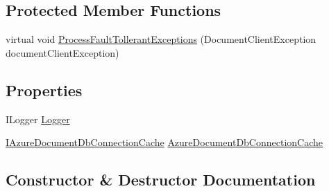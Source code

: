 \subsection*{Protected Member Functions}
\begin{DoxyCompactItemize}
\item 
virtual void \hyperlink{classCqrs_1_1Azure_1_1DocumentDb_1_1AzureDocumentDbHelper_a90b2dc3510f45a7cd5e6ed467a6f6d5e_a90b2dc3510f45a7cd5e6ed467a6f6d5e}{Process\+Fault\+Tollerant\+Exceptions} (Document\+Client\+Exception document\+Client\+Exception)
\end{DoxyCompactItemize}
\subsection*{Properties}
\begin{DoxyCompactItemize}
\item 
I\+Logger \hyperlink{classCqrs_1_1Azure_1_1DocumentDb_1_1AzureDocumentDbHelper_a2943b251ec8cb01b5900607e225de45e_a2943b251ec8cb01b5900607e225de45e}{Logger}
\item 
\hyperlink{interfaceCqrs_1_1Azure_1_1DocumentDb_1_1IAzureDocumentDbConnectionCache}{I\+Azure\+Document\+Db\+Connection\+Cache} \hyperlink{classCqrs_1_1Azure_1_1DocumentDb_1_1AzureDocumentDbHelper_a1cda97d11a3b15128de55b31fe32b9d4_a1cda97d11a3b15128de55b31fe32b9d4}{Azure\+Document\+Db\+Connection\+Cache}
\end{DoxyCompactItemize}


\subsection{Constructor \& Destructor Documentation}
\mbox{\label{classCqrs_1_1Azure_1_1DocumentDb_1_1AzureDocumentDbHelper_af6557961f9bfc7685a1197d5fd40a35e_af6557961f9bfc7685a1197d5fd40a35e}} 
